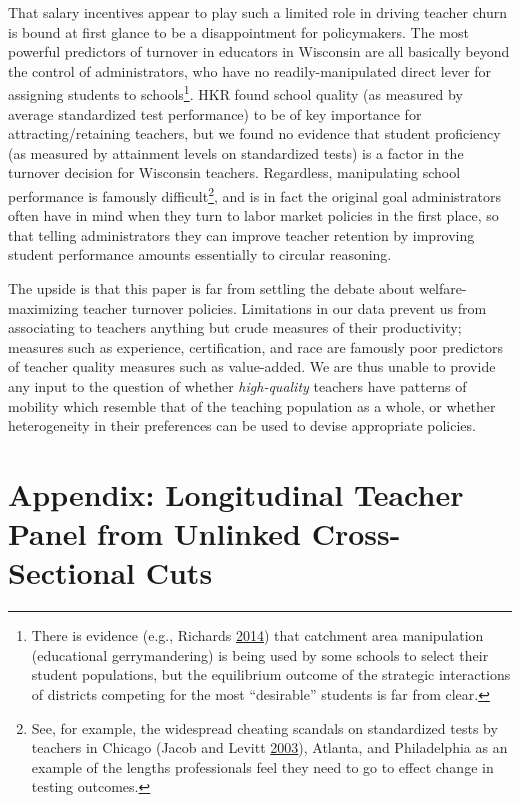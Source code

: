 \documentclass[12pt,]{article}
\let\rmarkdownfootnote\footnote%
\def\footnote{\protect\rmarkdownfootnote}
\begin{document}
That salary incentives appear to play such a limited role in driving
teacher churn is bound at first glance to be a disappointment for
policymakers. The most powerful predictors of turnover in educators in
Wisconsin are all basically beyond the control of administrators, who
have no readily-manipulated direct lever for assigning students to
schools\footnote{There is evidence (e.g., Richards
  \protect\hyperlink{ref-richards}{2014}) that catchment area
  manipulation (educational gerrymandering) is being used by some
  schools to select their student populations, but the equilibrium
  outcome of the strategic interactions of districts competing for the
  most ``desirable'' students is far from clear.}. HKR found school
quality (as measured by average standardized test performance) to be of
key importance for attracting/retaining teachers, but we found no
evidence that student proficiency (as measured by attainment levels on
standardized tests) is a factor in the turnover decision for Wisconsin
teachers. Regardless, manipulating school performance is famously
difficult\footnote{See, for example, the widespread cheating scandals on
  standardized tests by teachers in Chicago (Jacob and Levitt
  \protect\hyperlink{ref-jacob}{2003}), Atlanta, and Philadelphia as an
  example of the lengths professionals feel they need to go to effect
  change in testing outcomes.}, and is in fact the original goal
administrators often have in mind when they turn to labor market
policies in the first place, so that telling administrators they can
improve teacher retention by improving student performance amounts
essentially to circular reasoning.

The upside is that this paper is far from settling the debate about
welfare-maximizing teacher turnover policies. Limitations in our data
prevent us from associating to teachers anything but crude measures of
their productivity; measures such as experience, certification, and race
are famously poor predictors of teacher quality measures such as
value-added. We are thus unable to provide any input to the question of
whether \emph{high-quality} teachers have patterns of mobility which
resemble that of the teaching population as a whole, or whether
heterogeneity in their preferences can be used to devise appropriate
policies.

\section{Appendix: Longitudinal Teacher Panel from Unlinked
Cross-Sectional
Cuts}\label{appendix-longitudinal-teacher-panel-from-unlinked-cross-sectional-cuts}
\end{document}
